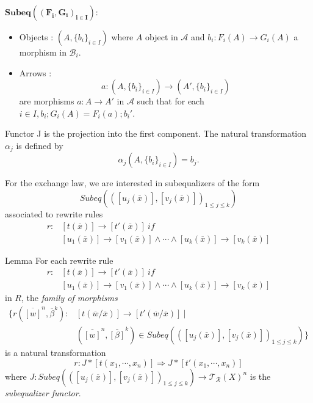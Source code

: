 \documentclass{beamer}
\begin{document}
\begin{frame}
    \scriptsize
    $\mathbf{Subeq((F_i,G_i)_{i \in I})}$:
    \begin{itemize}
        \item Objects : $(A,\{b_i\}_{i \in I})$ where $A$ object in $\mathcal{A}$ and $b_i:F_i(A) \rightarrow G_i(A)$ a morphism in $\mathcal{B}_i$.
        \item Arrows : $$ a: (A,\{b_i\}_{i \in I}) \rightarrow (A',\{b_i\}_{i \in I})$$
        are morphisms $a: A \rightarrow A'$ in $\mathcal{A}$ such that for each $i \in I,b_i;G_i(A)=F_i(a);b_i'.$
    \end{itemize}

    \bigskip
    \pause 
    Functor J is the projection into the first component. The natural transformation $\alpha_j$ is defined by 
    $$\alpha_j(A,\{b_i\}_{i \in I}) =  b_j.$$ 

    \bigskip
    \pause
    For the exchange law, we are interested in subequalizers of the form 
    $$ Subeq(([u_j(\overline{x})],[v_j(\overline{x})])_{1 \le j \le k}) $$ 
    associated  to rewrite rules 
    \begin{align*}
        r:&[t(\overline{x})] \rightarrow [t'(\overline{x})]\ if \\ 
        &[u_1(\overline{x})] \rightarrow [v_1(\overline{x})] \wedge \cdots \wedge [u_k(\overline{x})] \rightarrow [v_k(\overline{x})] 
    \end{align*} 
\end{frame}
\begin{frame}
    \begin{block}{Lemma}
        For each rewrite rule
        \begin{align*}
            r:&[t(\overline{x})] \rightarrow [t'(\overline{x})]\ if \\ 
            &[u_1(\overline{x})] \rightarrow [v_1(\overline{x})] \wedge \cdots \wedge [u_k(\overline{x})] \rightarrow [v_k(\overline{x})] 
            \end{align*}
        in $R$, the \emph{family of morphisms}
        \begin{align*}
            \{r(\overline{[w]}^n,\overline{\beta}^k):&[t(\overline{w}/ \overline{x})] \rightarrow [t'(\overline{w}/ \overline{x})]\ | \\ 
            &(\overline{[w]}^n,\overline{[\beta]}^k) \in Subeq(([u_j(\overline{x})],[v_j(\overline{x})])_{1 \le j \le k})\}
            \end{align*}
        is a natural transformation 
        $$r: J * [t(x_1,\cdots,x_n)] \Rightarrow J * [t'(x_1,\cdots,x_n)]$$
        where $J: Subeq(([u_j(\overline{x})],[v_j(\overline{x})])_{1 \le j \le k}) \rightarrow \mathcal{T_R}(X)^n$ is the \emph{subequalizer functor}.
    \end{block}
\end{frame}
\end{document}
